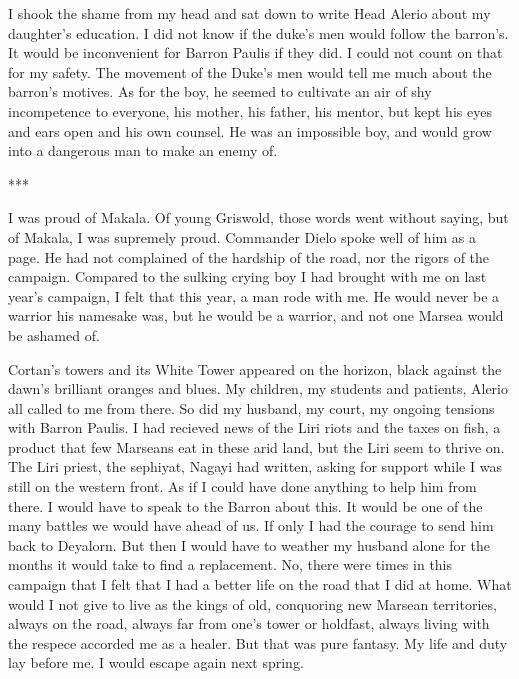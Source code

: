 \documentclass{article}
\begin{document}
I shook the shame from my head and sat down to write Head Alerio about my daughter's education. I did not know if the duke's men would follow the barron's. It would be inconvenient for Barron Paulis if they did. I could not count on that for my safety. The movement of the Duke's men would tell me much about the barron's motives. As for the boy, he seemed to cultivate an air of shy incompetence to everyone, his mother, his father, his mentor, but kept his eyes and ears open and his own counsel. He was an impossible boy, and would grow into a dangerous man to make an enemy of.

\vspace{.5cm}
***

I was proud of Makala. Of young Griswold, those words went without saying, but of Makala, I was supremely proud. Commander Dielo spoke well of him as a page. He had not complained of the hardship of the road, nor the rigors of the campaign. Compared to the sulking crying boy I had brought with me on last year's campaign, I felt that this year, a man rode with me. He would never be a warrior his namesake was, but he would be a warrior, and not one Marsea would be ashamed of. 

Cortan's towers and its White Tower appeared on the horizon, black against the dawn's brilliant oranges and blues. My children, my students and patients, Alerio all called to me from there. So did my husband, my court, my ongoing tensions with Barron Paulis. I had recieved news of the Liri riots and the taxes on fish, a product that few Marseans eat in these arid land, but the Liri seem to thrive on. The Liri priest, the sephiyat, Nagayi had written, asking for support while I was still on the western front. As if I could have done anything to help him from there. I would have to speak to the Barron about this. It would be one of the many battles we would have ahead of us. If only I had the courage to send him back to Deyalorn. But then I would have to weather my husband alone for the months it would take to find a replacement. No, there were times in this campaign that I felt that I had a better life on the road that I did at home. What would I not give to live as the kings of old, conquoring new Marsean territories, always on the road, always far from one's tower or holdfast, always living with the respece accorded me as a healer. But that was pure fantasy. My life and duty lay before me. I would escape again next spring.

\vpsace{.5cm}
\end{document}
